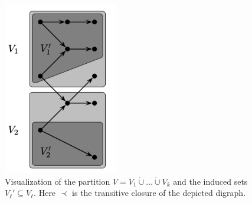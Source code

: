 \begin{figure}
\begin{center}
    \includegraphics[width=5cm]{chapters/scheduling1/transitive_closure}
  \end{center}
  \caption{Visualization of the partition $V = V_1 \dot{\cup} \ldots \dot{\cup} V_k$ and the induced sets $V_{\ell}' \subseteq V_{\ell}$. Here $\prec$ is the transitive closure of the depicted digraph.}
  \end{figure}
  

